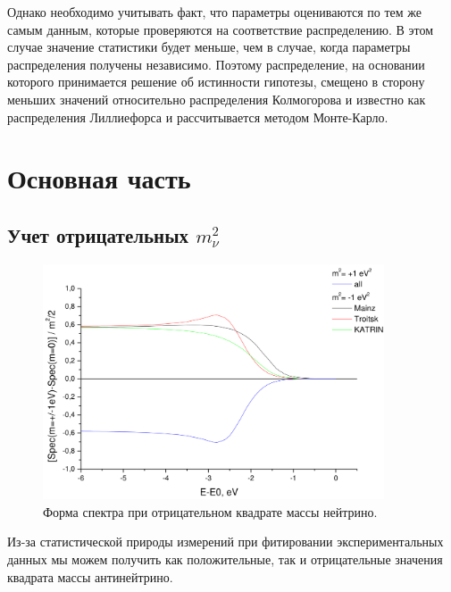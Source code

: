 \documentclass[a4paper,14pt]{extarticle}
\begin{document}
    Однако необходимо учитывать факт, что параметры оцениваются по тем же самым данным, которые
    проверяются на соответствие распределению. В этом случае значение статистики будет меньше,
    чем в случае, когда параметры распределения получены независимо. Поэтому распределение, 
    на основании которого принимается решение об истинности гипотезы, смещено в сторону меньших
    значений относительно распределения Колмогорова и известно как распределения Лиллиефорса и
    рассчитывается методом Монте-Карло.
    

    
    \newpage
    \section{Основная часть}
    
    \subsection{Учет отрицательных $m_{\nu}^2$}
    
    \begin{figure}[h]
        \center
        \includegraphics[width=0.9\textwidth]{neg_mnu2.png}
        \captionsetup{width=0.8\textwidth}
        \caption{Форма спектра при отрицательном квадрате массы нейтрино.}
        \label{fig:neg_mnu2}
    \end{figure}
    
    Из-за статистической природы измерений при фитировании экспериментальных данных мы можем
    получить как положительные, так и отрицательные значения квадрата массы антинейтрино.
    
\end{document}
